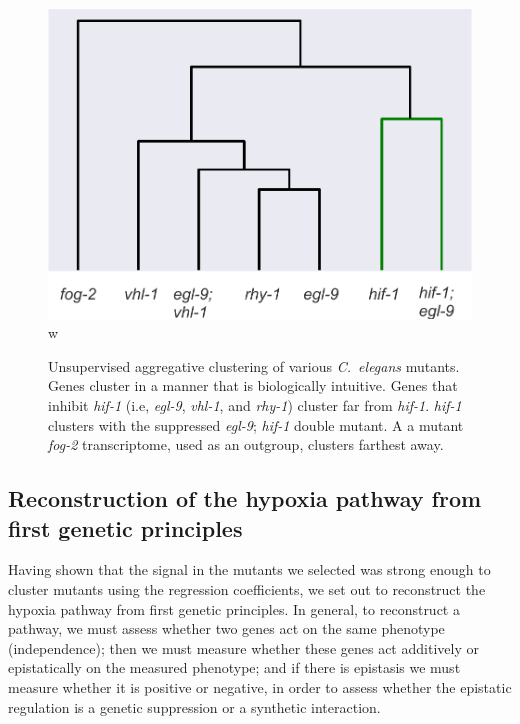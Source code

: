 \documentclass[9pt,twocolumn,twoside]{pnas-new}
\newcommand{\cel}{\emph{C.~elegans}}
\newcommand{\egl}{\emph{egl-9}}
\newcommand{\rhy}{\emph{rhy-1}}
\newcommand{\vhl}{\emph{vhl-1}}
\newcommand{\hif}{\emph{hif-1}}
\newcommand{\fog}{\emph{fog-2}}
\begin{document}
\begin{figure}%
\centering
\includegraphics[width=0.75\linewidth]{figs/dendrogram.pdf}w
\caption{
Unsupervised aggregative clustering of various \cel{} mutants. Genes
cluster in a manner that is biologically intuitive. Genes that inhibit \hif{}
(i.e, \egl{}, \vhl{}, and \rhy{}) cluster far from \hif{}. \hif{} clusters with
the suppressed \egl{}; \hif{} double mutant. A a mutant \fog{} transcriptome,
used as an outgroup, clusters farthest away.
}
\label{fig:dendrogram}
\end{figure}

\subsection*{Reconstruction of the hypoxia pathway from first genetic principles}
\label{sec:reconstruct}
Having shown that the signal in the mutants we selected was strong enough to
cluster mutants using the regression coefficients, we set out to reconstruct the
hypoxia pathway from first genetic principles. In general, to reconstruct a pathway,
we must assess whether two genes act on the same phenotype (independence);
then we must measure whether these genes act additively or epistatically on the
measured phenotype; and if there is epistasis we must measure whether it is positive
or negative, in order to assess whether the epistatic regulation is a genetic
suppression or a synthetic interaction.
\end{document}
